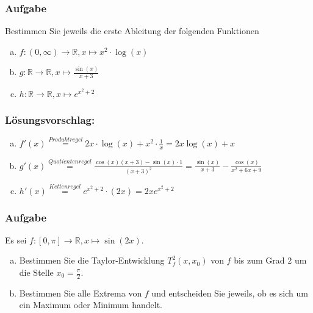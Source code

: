 \documentclass[a4paper,11pt]{scrartcl}
\newcounter{auf}
\newcommand{\Aufgabe}%
        {\addtocounter{auf}{1} \subsubsection*{\rmfamily  Aufgabe \theauf \hspace{1em}} }
\newcommand{\RR}{\mathbb{R}}
\begin{document}
\newpage
\Aufgabe
Bestimmen Sie jeweils die erste Ableitung der folgenden Funktionen

\begin{enumerate}[a)]
\item $f:(0,\infty) \to \RR, x \mapsto x^2 \cdot \log(x) $
\item $g: \RR \to \RR, x \mapsto\frac{\sin(x)}{x+3}$
\item $h:\RR \to \RR, x \mapsto e^{x^2+2} $
\end{enumerate}

\subsubsection*{Lösungsvorschlag:}

\begin{enumerate}[a)]
\item $f'(x)\stackrel{Produktregel}{=}2x\cdot \log(x)+x^2\cdot \frac{1}{x}=2x\log(x)+x$
\item $g'(x)\stackrel{Quotientenregel}{=}\frac{\cos(x)(x+3)-\sin(x)\cdot 1}{(x+3)^2}=\frac{\sin(x)}{x+3}-\frac{\cos(x)}{x^2+6x+9}$
\item $h'(x)\stackrel{Kettenregel}{=}e^{x^2+2}\cdot (2x)=2xe^{x^2+2}$
\end{enumerate}


\newpage
\Aufgabe
Es sei $f: [0,\pi] \to \RR, x \mapsto \sin(2x)$.
\begin{enumerate}[a)]
\item Bestimmen Sie die Taylor-Entwicklung $T^2_f(x,x_0)$ von $f$ bis zum Grad 2 um die Stelle $x_0=\frac{\pi}{2}$. 
\item Bestimmen Sie alle Extrema von $f$ und entscheiden Sie jeweils, ob es sich um ein Maximum oder Minimum handelt.
\end{enumerate}
\end{document}
